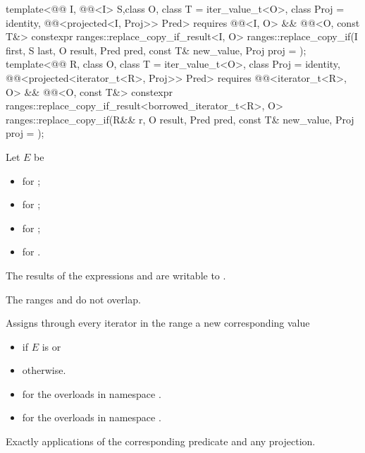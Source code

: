 \begin{itemdecl}
template<@@ I, @@<I> S,class O, class T = iter_value_t<O>,
         class Proj = identity, @@<projected<I, Proj>> Pred>
  requires @@<I, O> && @@<O, const T&>
  constexpr ranges::replace_copy_if_result<I, O>
    ranges::replace_copy_if(I first, S last, O result, Pred pred, const T& new_value,
                            Proj proj = {});
template<@@ R, class O, class T = iter_value_t<O>, class Proj = identity,
         @@<projected<iterator_t<R>, Proj>> Pred>
  requires @@<iterator_t<R>, O> && @@<O, const T&>
  constexpr ranges::replace_copy_if_result<borrowed_iterator_t<R>, O>
    ranges::replace_copy_if(R&& r, O result, Pred pred, const T& new_value,
                            Proj proj = {});
\end{itemdecl}

\begin{itemdescr}
\setlength{\emergencystretch}{1.5em}
\pnum
Let $E$ be
\begin{itemize}
\item {}
  for ;
\item {}
  for ;
\item {}
  for ;
\item {}
  for .
\end{itemize}

\pnum
\mandates
The results of the expressions  and 
are writable to .

\pnum
\expects
The ranges  and 
do not overlap.

\pnum
\effects
Assigns through every iterator 
in the range 
a new corresponding value
\begin{itemize}
\item {} if $E$ is  or
\item {} otherwise.
\end{itemize}

\pnum
\returns
\begin{itemize}
\item
  for the overloads in namespace .
\item
  for the overloads in namespace .
\end{itemize}

\pnum
\complexity
Exactly  applications
of the corresponding predicate and any projection.
\end{itemdescr}

